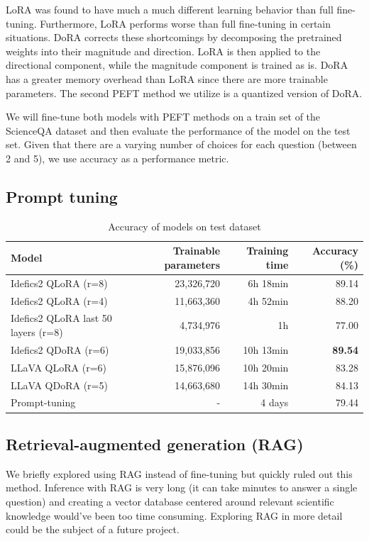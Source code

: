 \documentclass{article}
\begin{document}
LoRA was found to have much a much different learning behavior than full fine-tuning. Furthermore, LoRA performs worse than full fine-tuning in certain situations. DoRA corrects these shortcomings by decomposing the pretrained weights into their magnitude and direction. LoRA is then applied to the directional component, while the magnitude component is trained as is. DoRA has a greater memory overhead than LoRA since there are more trainable parameters. The second PEFT method we utilize is a quantized version of DoRA.\par

We will fine-tune both models with PEFT methods on a train set of the ScienceQA dataset and then evaluate the performance of the model on the test set. Given that there are a varying number of choices for each question (between 2 and 5), we use accuracy as a performance metric.

\subsection{Prompt tuning}

\begin{table}[t]
  \centering
  \begin{tabular}{lrrr}
    \hline
    Model & Trainable parameters & Training time & Accuracy (\%)\\ 
    \hline
    Idefics2 QLoRA (r=8) & 23,326,720 & 6h 18min & 89.14\\ 
    Idefics2 QLoRA (r=4) & 11,663,360 & 4h 52min & 88.20\\ 
    Idefics2 QLoRA last 50 layers (r=8) & 4,734,976 & 1h & 77.00\\
    Idefics2 QDoRA (r=6) & 19,033,856 & 10h 13min & \textbf{89.54}\\
    LLaVA QLoRA (r=6) & 15,876,096 & 10h 20min & 83.28\\
    LLaVA QDoRA (r=5) & 14,663,680 & 14h 30min & 84.13\\
    Prompt-tuning & - & 4 days & 79.44\\
    \hline
  \end{tabular}
  \caption{Accuracy of models on test dataset}
  \label{tab:model_performance}
\end{table}

\subsection{Retrieval-augmented generation (RAG)}
We briefly explored using RAG instead of fine-tuning but quickly ruled out this method. Inference with RAG is very long (it can take minutes to answer a single question) and creating a vector database centered around relevant scientific knowledge would've been too time consuming. Exploring RAG in more detail could be the subject of a future project.
\end{document}
